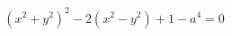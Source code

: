 \documentclass[preview]{standalone}
\begin{document}
\begin{align*}
(x^2 + y^2)^2 - 2(x^2 - y^2) + 1 - a^4 = 0
\end{align*}
\end{document}
